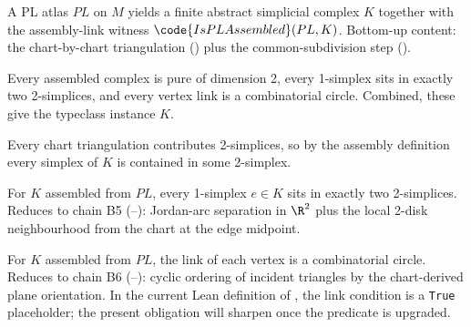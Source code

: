 \begin{lemma}
\label{lem:rado-pl-assembled-complex-exists}
A PL atlas \(PL\) on \(M\) yields a finite abstract simplicial complex
\(K\) together with the assembly-link witness \(\code{IsPLAssembled}(PL, K)\).  Bottom-up content: the chart-by-chart
triangulation () plus the
common-subdivision step ().
\leanok
\end{lemma}

\begin{lemma}
\label{lem:rado-pl-assembled-is-2mfd}
Every assembled complex is pure of dimension 2, every 1-simplex sits
in exactly two 2-simplices, and every vertex link is a combinatorial
circle.  Combined, these give the typeclass instance
 \(K\).
\leanok
\end{lemma}

\begin{lemma}
\label{lem:rado-pl-assembled-pure2}
Every chart triangulation contributes 2-simplices, so by the assembly
definition every simplex of \(K\) is contained in some 2-simplex.
\leanok
\end{lemma}

\begin{lemma}
\label{lem:rado-pl-assembled-edge-condition}
For \(K\) assembled from \(PL\), every 1-simplex \(e\in K\) sits in
exactly two 2-simplices.  Reduces to chain B5
(--): Jordan-arc separation in
\(\R^{2}\) plus the local 2-disk neighbourhood from the chart at the
edge midpoint.
\leanok
\end{lemma}

\begin{lemma}
\label{lem:rado-pl-assembled-vertex-link}
For \(K\) assembled from \(PL\), the link of each vertex is a
combinatorial circle.  Reduces to chain B6
(--): cyclic ordering of incident
triangles by the chart-derived plane orientation.  In the current
Lean definition of , the link condition
is a \texttt{True} placeholder; the present obligation will sharpen
once the predicate is upgraded.
\leanok
\end{lemma}


